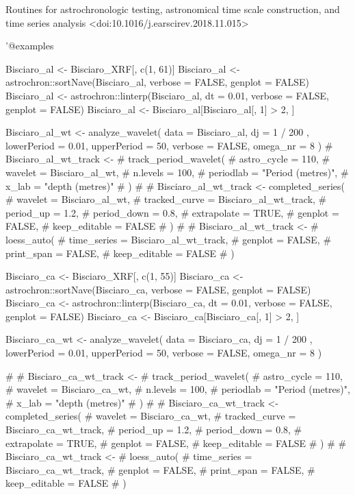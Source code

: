 \documentclass[a4paper]{book}
\begin{document}
\begin{References}
Routines for astrochronologic testing, astronomical time scale construction, and
time series analysis <doi:10.1016/j.earscirev.2018.11.015>

'@examples



Bisciaro\_al <- Bisciaro\_XRF[, c(1, 61)]
Bisciaro\_al <-
 astrochron::sortNave(Bisciaro\_al, verbose = FALSE, genplot = FALSE)
Bisciaro\_al <-
 astrochron::linterp(Bisciaro\_al,
                     dt = 0.01,
                     verbose = FALSE,
                     genplot = FALSE)
Bisciaro\_al <- Bisciaro\_al[Bisciaro\_al[, 1] > 2, ]

Bisciaro\_al\_wt <-
 analyze\_wavelet(
   data = Bisciaro\_al,
   dj = 1 / 200 ,
   lowerPeriod = 0.01,
   upperPeriod = 50,
   verbose = FALSE,
   omega\_nr = 8
 )
\# Bisciaro\_al\_wt\_track <-
\#   track\_period\_wavelet(
\#     astro\_cycle = 110,
\#     wavelet = Bisciaro\_al\_wt,
\#     n.levels = 100,
\#     periodlab = "Period (metres)",
\#     x\_lab = "depth (metres)"
\#   )
\#
\# Bisciaro\_al\_wt\_track <- completed\_series(
\#   wavelet = Bisciaro\_al\_wt,
\#   tracked\_curve = Bisciaro\_al\_wt\_track,
\#   period\_up = 1.2,
\#   period\_down = 0.8,
\#   extrapolate = TRUE,
\#   genplot = FALSE,
\#   keep\_editable = FALSE
\# )
\#
\# Bisciaro\_al\_wt\_track <-
\#   loess\_auto(
\#     time\_series = Bisciaro\_al\_wt\_track,
\#     genplot = FALSE,
\#     print\_span = FALSE,
\#     keep\_editable = FALSE
\#   )



Bisciaro\_ca <- Bisciaro\_XRF[, c(1, 55)]
Bisciaro\_ca <-
 astrochron::sortNave(Bisciaro\_ca, verbose = FALSE, genplot = FALSE)
Bisciaro\_ca <-
 astrochron::linterp(Bisciaro\_ca,
                     dt = 0.01,
                     verbose = FALSE,
                     genplot = FALSE)
Bisciaro\_ca <- Bisciaro\_ca[Bisciaro\_ca[, 1] > 2, ]

Bisciaro\_ca\_wt <-
 analyze\_wavelet(
   data = Bisciaro\_ca,
   dj = 1 / 200 ,
   lowerPeriod = 0.01,
   upperPeriod = 50,
   verbose = FALSE,
   omega\_nr = 8
 )


\#
\# Bisciaro\_ca\_wt\_track <-
\#   track\_period\_wavelet(
\#     astro\_cycle = 110,
\#     wavelet = Bisciaro\_ca\_wt,
\#     n.levels = 100,
\#     periodlab = "Period (metres)",
\#     x\_lab = "depth (metres)"
\#   )
\#
\# Bisciaro\_ca\_wt\_track <- completed\_series(
\#   wavelet = Bisciaro\_ca\_wt,
\#   tracked\_curve = Bisciaro\_ca\_wt\_track,
\#   period\_up = 1.2,
\#   period\_down = 0.8,
\#   extrapolate = TRUE,
\#   genplot = FALSE,
\#   keep\_editable = FALSE
\# )
\#
\# Bisciaro\_ca\_wt\_track <-
\#   loess\_auto(
\#     time\_series = Bisciaro\_ca\_wt\_track,
\#     genplot = FALSE,
\#     print\_span = FALSE,
\#     keep\_editable = FALSE
\#   )



\end{References}
\end{document}
